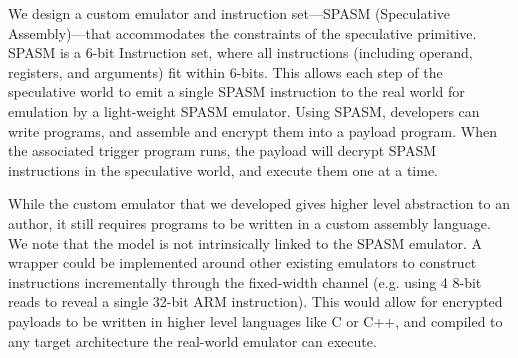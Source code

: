 We design a custom emulator and instruction set---SPASM (Speculative
Assembly)---that accommodates the constraints of the speculative primitive.
SPASM is a 6-bit Instruction set, where all instructions (including operand,
registers, and arguments) fit within 6-bits. This allows each step of the
speculative world to emit a single SPASM instruction to the real world for
emulation by a light-weight SPASM emulator. Using SPASM, developers can write
programs, and assemble and encrypt them into a payload program. When the
associated trigger program runs, the payload will decrypt SPASM instructions in
the speculative world, and execute them one at a time.



While the custom emulator that we developed gives higher level abstraction to
an author, it still requires programs to be written in a custom assembly language. 
We note that the \speculake model is not intrinsically linked to the SPASM emulator. 
A wrapper could be implemented around other existing emulators to construct
instructions incrementally through the fixed-width channel (e.g. using 4 8-bit
reads to reveal a single 32-bit ARM instruction).
This would allow for encrypted payloads to be written in higher level languages
like C or C++, and compiled to any target architecture the real-world emulator
can execute.
